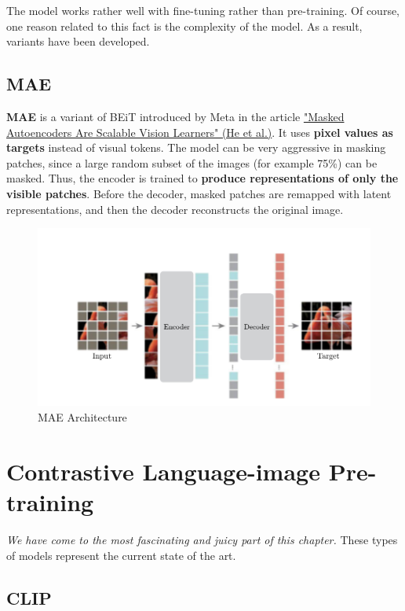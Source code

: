 The model works rather well with fine-tuning rather than pre-training. Of course, one reason related to this fact is the complexity of the model. As a result, variants have been developed.

\subsection{MAE}

\textbf{MAE} is a variant of BEiT introduced by Meta in the article \href{https://arxiv.org/pdf/2111.06377}{"Masked Autoencoders Are Scalable Vision Learners" (He et al.)}. It uses \textbf{pixel values as targets} instead of visual tokens. The model can be very aggressive in masking patches, since a large random subset of the images (for example 75\%) can be masked. Thus, the encoder is trained to \textbf{produce representations of only the visible patches}. Before the decoder, masked patches are remapped with latent representations, and then the decoder reconstructs the original image.

\begin{figure}[!htbp]
    \centering
    \includegraphics[width=\linewidth]{tikz/chapter11 - MAE.pdf}
    \caption{MAE Architecture}
\end{figure}


\section{Contrastive Language-image Pre-training}

\textit{We have come to the most fascinating and juicy part of this chapter.} These types of models represent the current state of the art. 

\subsection{CLIP}

